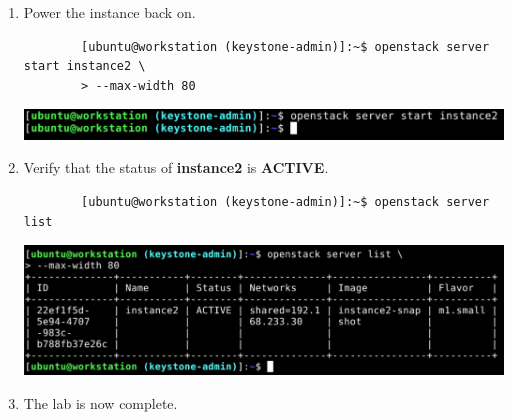 \documentclass[letterpaper, 12pt]{article}
\begin{document}
\begin{enumerate}
    \item Power the instance back on.
    \begin{lstlisting}
        [ubuntu@workstation (keystone-admin)]:~$ openstack server start instance2 \
        > --max-width 80
    \end{lstlisting}

    \begin{center}
        \includegraphics[width=\linewidth]{images/part4/step19.png}
    \end{center}

    \item Verify that the status of \textbf{instance2} is \textbf{ACTIVE}.
    \begin{lstlisting}
        [ubuntu@workstation (keystone-admin)]:~$ openstack server list
    \end{lstlisting}

    \begin{center}
        \includegraphics[width=\linewidth]{images/part4/step20.png}
    \end{center}

    \item The lab is now complete.

\end{enumerate}
\end{document}
